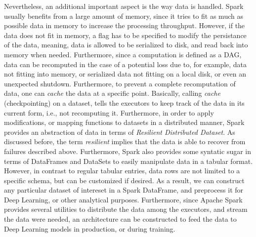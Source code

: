 Nevertheless, an additional important aspect is the way data is handled. Spark usually benefits from a large amount of memory, since it tries to fit as much as possible data in memory to increase the processing throughput. However, if the data does not fit in memory, a flag has to be specified to modify the persistance of the data, meaning, data is allowed to be serialized to disk, and read back into memory when needed. Furthermore, since a computation is defined as a DAG, data can be recomputed in the case of a potential loss due to, for example, data not fitting into memory, or serialized data not fitting on a local disk, or even an unexpected shutdown. Furthermore, to prevent a complete recomputation of data, one can \emph{cache} the data at a specific point. Basically, calling \emph{cache} (checkpointing) on a dataset, tells the executors to keep track of the data in its current form, i.e., not recomputing it. Furthermore, in order to apply modifications, or mapping functions to datasets in a distributed manner, Spark provides an abstraction of data in terms of \emph{Resilient Distributed Dataset}. As discussed before, the term \emph{resilient} implies that the data is able to recover from failures described above. Furthermore, Spark also provides some syntatic sugar in terms of DataFrames and DataSets to easily manipulate data in a tabular format. However, in contrast to regular tabular entries, data rows are not limited to a specific schema, but can be customized if desired. As a result, we can construct any particular dataset of intereset in a Spark DataFrame, and preprocess it for Deep Learning, or other analytical purposes. Furthermore, since Apache Spark provides several utilities to distribute the data among the executors, and stream the data were needed, an architecture can be constructed to feed the data to Deep Learning models in production, or during training.\\

